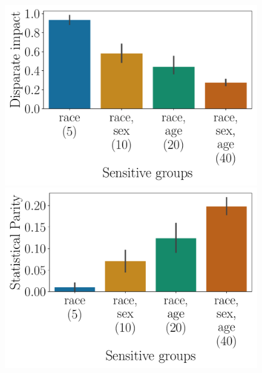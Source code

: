 \begin{figure}[t!]
		\begin{minipage}{0.48\textwidth}
		\centering
		\begin{minipage}{0.48\columnwidth}
			\includegraphics[scale=.15]{figures/fairness/justicia/sensitive_attribute_race_di_Adult_DT_RE.pdf}
		\end{minipage}
		\begin{minipage}{0.48\columnwidth}
			\includegraphics[scale=.15]{figures/fairness/justicia/sensitive_attribute_race_spd_Adult_DT_RE.pdf}
		\end{minipage}

\end{minipage}
\end{figure}
